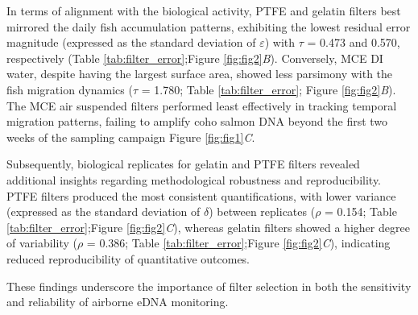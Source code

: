 \documentclass{article}
\begin{document}


In terms of alignment with the biological activity, PTFE and gelatin filters best mirrored the daily fish accumulation patterns, exhibiting the lowest residual error magnitude (expressed as the standard deviation of $\varepsilon$) with $\tau$ = 0.473 and 0.570, respectively (Table \ref{tab:filter_error};Figure \ref{fig:fig2}\textit{B}). Conversely, MCE DI water, despite having the largest surface area, showed less parsimony with the fish migration dynamics ($\tau$ = 1.780; Table \ref{tab:filter_error}; Figure \ref{fig:fig2}\textit{B}). The MCE air suspended filters performed least effectively in tracking temporal migration patterns, failing to amplify coho salmon DNA beyond the first two weeks of the sampling campaign Figure \ref{fig:fig1}\textit{C}.

Subsequently, biological replicates for gelatin and PTFE filters revealed additional insights regarding methodological robustness and reproducibility. PTFE filters produced the most consistent quantifications, with lower variance (expressed as the standard deviation of $\delta$) between replicates ($\rho$ = 0.154; Table \ref{tab:filter_error};Figure \ref{fig:fig2}\textit{C}), whereas gelatin filters showed a higher degree of variability ($\rho$ = 0.386; Table \ref{tab:filter_error};Figure \ref{fig:fig2}\textit{C}), indicating reduced reproducibility of quantitative outcomes. 

These findings underscore the importance of filter selection in both the sensitivity and reliability of airborne eDNA monitoring.
\end{document}
